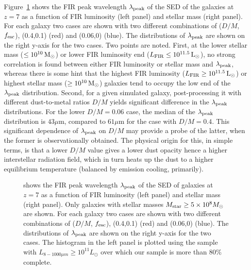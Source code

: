 Figure~\ref{fig:peak} shows the FIR peak wavelength $\lambda_{\rm peak}$ of the SED of the galaxies at $z=7$ 
as a function of FIR luminosity (left panel) and stellar mass (right panel).
For each galaxy two cases are shown with two different combinations of ($D/M$, $f_{\rm esc}$), (0.4,0.1) (red) and (0.06,0) (blue).
The distributions of $\lambda_{\rm peak}$ are shown on the right y-axis for the two cases.
Two points are noted.
First, at the lower stellar mass ($\le 10^{10}{\rm\,M_\odot}$) or lower FIR luminosity end ($L_{\rm FIR}\le 10^{11.5}{\rm\,L_\odot}$),
no strong correlation is found between either FIR luminosity or stellar mass and $\lambda_{\rm peak}$,
whereas there is some hint that the highest FIR luminosity 
($L_{\rm FIR}\ge 10^{11.5}{\rm\,L_\odot}$)
or highest stellar mass ($\ge 10^{10}{\rm\,M_\odot}$) 
galaxies tend to occupy the low end of the $\lambda_{\rm peak}$ distribution.
Second, for a given simulated galaxy, post-processing it with different dust-to-metal ratios $D/M$
yields significant difference in the $\lambda_{\rm peak}$ distributions.
For the lower $D/M=0.06$ case, the median of the $\lambda_{\rm peak}$ distribution is $43\mu$m,
compared to $61\mu$m for the case with $D/M=0.4$.
This significant dependence of $\lambda_{\rm peak}$ on $D/M$ may provide a probe
of the latter, when the former is observationally obtained.
The physical origin for this, in simple terms, is that a lower $D/M$ value gives a lower dust opacity
hence a higher interstellar radiation field, which in turn heats up the dust to a higher
equilibrium temperature (balanced by emission cooling, primarily).


\begin{figure}[!ht]
\centering
\vskip -0cm
\hskip -1cm
\hskip -0cm
\vskip -0cm
\caption{%
shows the FIR peak wavelength $\lambda_{\rm peak}$ of the SED of galaxies at $z=7$ 
as a function of FIR luminosity (left panel) and stellar mass (right panel).
Only galaxies with stellar masses $M_{\rm star} \ge 5\times 10^8 M_{\odot}$ are shown.
For each galaxy two cases are shown with two different combinations of ($D/M$, $f_{\rm esc}$), (0.4,0.1) (red) and (0.06,0) (blue).
The distributions of $\lambda_{\rm peak}$ are shown on the right y-axis for the two cases.
The histogram in the left panel is plotted using the sample with $L_{8-1000\mu m} \ge 10^{11} L_{\odot}$
over which our sample is more than 80\% complete.
}
\label{fig:peak}
\end{figure}

